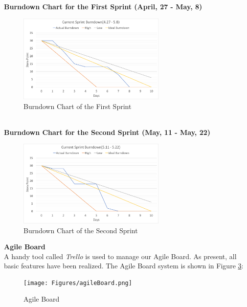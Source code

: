 \documentclass{report}
\begin{document}
\clearpage
\textbf{Burndown Chart for the First Sprint (April, 27 - May, 8)}
\begin{figure}[htp]
\centering
\includegraphics[width=0.65\textwidth]{Figures/sprint1Burndown.pdf}
\caption{Burndown Chart of the First Sprint}
\label{fig:sprint1Burndown}
\end{figure}
\\
\textbf{Burndown Chart for the Second Sprint (May, 11 - May, 22)}
\begin{figure}[htp]
\centering
\includegraphics[width=0.65\textwidth]{Figures/sprint2Burndown.pdf}
\caption{Burndown Chart of the Second Sprint}
\label{fig:sprint2Burndown}
\end{figure}

\clearpage
\textbf{Agile Board}
\\
A handy tool called \textit{Trello} is used to manage our Agile Board. As present, all basic features have been realized. The Agile Board system is shown in Figure \ref{fig:agileBoard}:

\begin{figure}[htp]
\centering
\texttt{[image: Figures/agileBoard.png]}
\caption{Agile Board}
\label{fig:agileBoard}
\end{figure}
\end{document}
